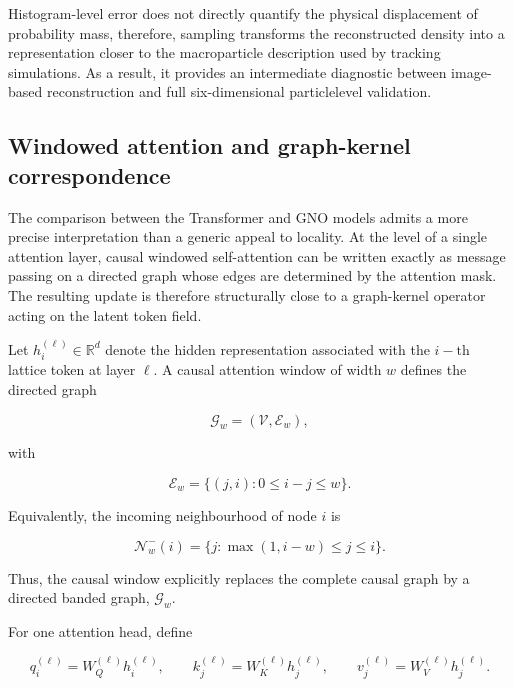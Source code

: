 Histogram-level error does not directly quantify the physical displacement of probability mass, therefore, sampling transforms the reconstructed density into a representation closer to the macroparticle description used by tracking simulations. As a result, it provides an intermediate diagnostic between image-based reconstruction and full six-dimensional particlelevel validation.

\subsection{Windowed attention and graph-kernel correspondence}
\label{sec:05_results_windowed_attention_and_graph_kernel_correspondence}

The comparison between the Transformer and GNO models admits a more precise interpretation than a generic appeal to locality. At the level of a single attention layer, causal windowed self-attention can be written exactly as message passing on a directed graph whose edges are determined by the attention mask. The resulting update is therefore structurally close to a graph-kernel operator acting on the latent token field.

Let \(h_{i}^{( \ell )} \in \mathbb{R}^{d}\) denote the hidden representation associated with the \(i - \mathrm{th}\) lattice token at layer \(\ell .\) A causal attention window of width \(w\) defines the directed graph

\begin{equation}
\label{eq:183}
\mathcal G_w=(\mathcal V,\mathcal E_w),
\end{equation}

with

\begin{equation}
\label{eq:184}
\mathcal E_w=\{(j,i):0\le i-j\le w\}.
\end{equation}

Equivalently, the incoming neighbourhood of node \(i\) is

\begin{equation}
\label{eq:185}
\mathcal N_w^{-}(i)=\{j:\max(1,i-w)\le j\le i\}.
\end{equation}

Thus, the causal window explicitly replaces the complete causal graph by a directed banded graph, \(\mathcal{G}_{w} .\)

For one attention head, define

\begin{equation}
\label{eq:186}
q_i^{(\ell)}=W_Q^{(\ell)}h_i^{(\ell)},\qquad k_j^{(\ell)}=W_K^{(\ell)}h_j^{(\ell)},\qquad v_j^{(\ell)}=W_V^{(\ell)}h_j^{(\ell)}.
\end{equation}

